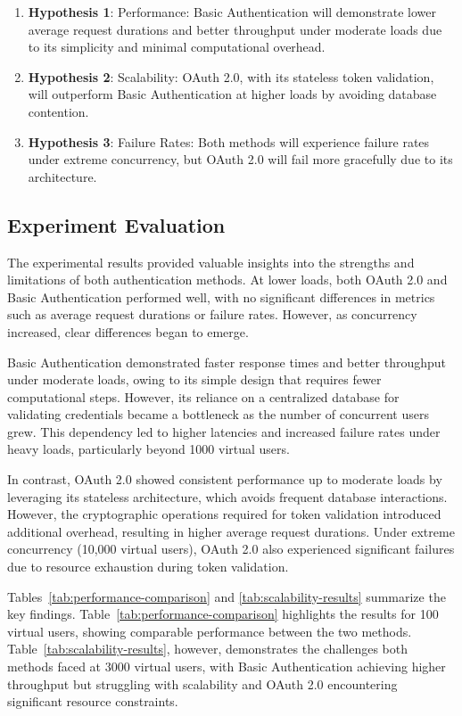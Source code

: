 \begin{enumerate}
    \item \textbf{Hypothesis 1}: Performance: Basic Authentication will demonstrate lower average request durations and better throughput under moderate loads due to its simplicity and minimal computational overhead.
    \item \textbf{Hypothesis 2}: Scalability: OAuth 2.0, with its stateless token validation, will outperform Basic Authentication at higher loads by avoiding database contention.
    \item \textbf{Hypothesis 3}: Failure Rates: Both methods will experience failure rates under extreme concurrency, but OAuth 2.0 will fail more gracefully due to its architecture.
\end{enumerate}

\subsection{Experiment Evaluation}

The experimental results provided valuable insights into the strengths and limitations of both authentication methods. At lower loads, both OAuth 2.0 and Basic Authentication performed well, with no significant differences in metrics such as average request durations or failure rates. However, as concurrency increased, clear differences began to emerge.

Basic Authentication demonstrated faster response times and better throughput under moderate loads, owing to its simple design that requires fewer computational steps. However, its reliance on a centralized database for validating credentials became a bottleneck as the number of concurrent users grew. This dependency led to higher latencies and increased failure rates under heavy loads, particularly beyond 1000 virtual users.

In contrast, OAuth 2.0 showed consistent performance up to moderate loads by leveraging its stateless architecture, which avoids frequent database interactions. However, the cryptographic operations required for token validation introduced additional overhead, resulting in higher average request durations. Under extreme concurrency (10,000 virtual users), OAuth 2.0 also experienced significant failures due to resource exhaustion during token validation.

Tables~\ref{tab:performance-comparison} and \ref{tab:scalability-results} summarize the key findings. Table~\ref{tab:performance-comparison} highlights the results for 100 virtual users, showing comparable performance between the two methods. Table~\ref{tab:scalability-results}, however, demonstrates the challenges both methods faced at 3000 virtual users, with Basic Authentication achieving higher throughput but struggling with scalability and OAuth 2.0 encountering significant resource constraints.

